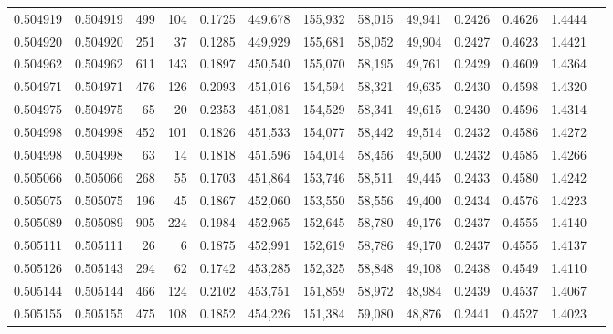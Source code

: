 \begin{tabular}{rrrrrrrrrrrrr}
0.504919 & 0.504919 &   499 &   104 &                                     0.1725 & 449,678 & 155,932 &  58,015 &  49,941 & 0.2426 & 0.4626 & 1.4444 \\
0.504920 & 0.504920 &   251 &    37 &                                     0.1285 & 449,929 & 155,681 &  58,052 &  49,904 & 0.2427 & 0.4623 & 1.4421 \\
0.504962 & 0.504962 &   611 &   143 &                                     0.1897 & 450,540 & 155,070 &  58,195 &  49,761 & 0.2429 & 0.4609 & 1.4364 \\
0.504971 & 0.504971 &   476 &   126 &                                     0.2093 & 451,016 & 154,594 &  58,321 &  49,635 & 0.2430 & 0.4598 & 1.4320 \\
0.504975 & 0.504975 &    65 &    20 &                                     0.2353 & 451,081 & 154,529 &  58,341 &  49,615 & 0.2430 & 0.4596 & 1.4314 \\
0.504998 & 0.504998 &   452 &   101 &                                     0.1826 & 451,533 & 154,077 &  58,442 &  49,514 & 0.2432 & 0.4586 & 1.4272 \\
0.504998 & 0.504998 &    63 &    14 &                                     0.1818 & 451,596 & 154,014 &  58,456 &  49,500 & 0.2432 & 0.4585 & 1.4266 \\
0.505066 & 0.505066 &   268 &    55 &                                     0.1703 & 451,864 & 153,746 &  58,511 &  49,445 & 0.2433 & 0.4580 & 1.4242 \\
0.505075 & 0.505075 &   196 &    45 &                                     0.1867 & 452,060 & 153,550 &  58,556 &  49,400 & 0.2434 & 0.4576 & 1.4223 \\
0.505089 & 0.505089 &   905 &   224 &                                     0.1984 & 452,965 & 152,645 &  58,780 &  49,176 & 0.2437 & 0.4555 & 1.4140 \\
0.505111 & 0.505111 &    26 &     6 &                                     0.1875 & 452,991 & 152,619 &  58,786 &  49,170 & 0.2437 & 0.4555 & 1.4137 \\
0.505126 & 0.505143 &   294 &    62 &                                     0.1742 & 453,285 & 152,325 &  58,848 &  49,108 & 0.2438 & 0.4549 & 1.4110 \\
0.505144 & 0.505144 &   466 &   124 &                                     0.2102 & 453,751 & 151,859 &  58,972 &  48,984 & 0.2439 & 0.4537 & 1.4067 \\
0.505155 & 0.505155 &   475 &   108 &                                     0.1852 & 454,226 & 151,384 &  59,080 &  48,876 & 0.2441 & 0.4527 & 1.4023 \\

\end{tabular}

